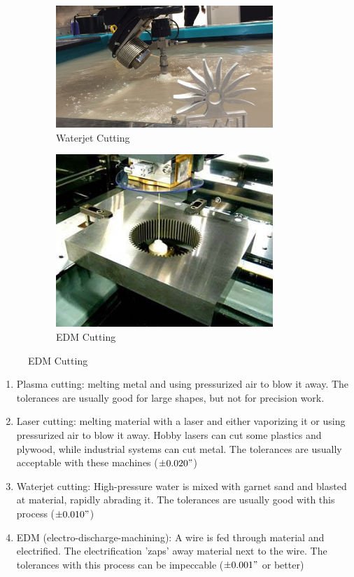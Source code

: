 \documentclass[10pt,letterpaper]{book}
\begin{document}
\begin{figure}[H]
\begin{subfigure}[b]{.24\linewidth}
			\includegraphics[width=0.9\textwidth]{imgs/waterjet.jpeg}
			\caption{Waterjet Cutting}
		\end{subfigure}\begin{subfigure}[b]{.24\linewidth}
			\includegraphics[width=0.9\textwidth]{imgs/edm.jpeg}
			\caption{EDM Cutting}
		\end{subfigure}
	\end{figure}
 
 \begin{enumerate}[label=\alph*]
  	\item Plasma cutting: melting metal and using pressurized air to blow it away. The tolerances are usually good for large shapes, but not for precision work.
 	\item Laser cutting: melting material with a laser and either vaporizing it or using pressurized air to blow it away. Hobby lasers can cut some plastics and plywood, while industrial systems can cut metal. The tolerances are usually acceptable with these machines ($\pm 0.020"$)
 	\item Waterjet cutting: High-pressure water is mixed with garnet sand and blasted at material, rapidly abrading it. The tolerances are usually good with this process ($\pm 0.010"$)
 	\item EDM (electro-discharge-machining): A wire is fed through material and electrified. The electrification 'zaps' away material next to the wire. The tolerances with this process can be impeccable ($\pm 0.001"$ or better) 
\end{enumerate}
 	
\end{document}
